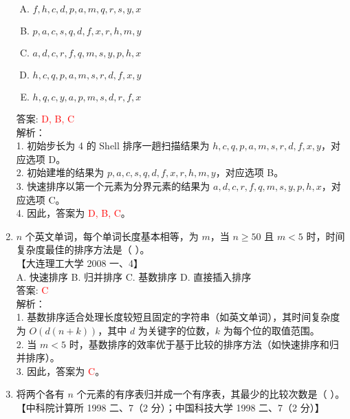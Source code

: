 \documentclass[lang=cn,newtx,10pt,scheme=chinese]{../../../elegantbook}
\begin{document}
\begin{enumerate}
    \begin{enumerate}[A.]
        \item $f, h, c, d, p, a, m, q, r, s, y, x$\\
        \item $p, a, c, s, q, d, f, x, r, h, m, y$\\
        \item $a, d, c, r, f, q, m, s, y, p, h, x$\\
        \item $h, c, q, p, a, m, s, r, d, f, x, y$\\
        \item $h, q, c, y, a, p, m, s, d, r, f, x$\\
    \end{enumerate}

    答案: \textcolor{red}{D, B, C} \\

    解析：\\
    1. 初始步长为 4 的 Shell 排序一趟扫描结果为 $h, c, q, p, a, m, s, r, d, f, x, y$，对应选项 D。\\
    2. 初始建堆的结果为 $p, a, c, s, q, d, f, x, r, h, m, y$，对应选项 B。\\
    3. 快速排序以第一个元素为分界元素的结果为 $a, d, c, r, f, q, m, s, y, p, h, x$，对应选项 C。\\
    4. 因此，答案为 \textcolor{red}{D, B, C}。\\
    \item $n$ 个英文单词，每个单词长度基本相等，为 $m$，当 $n ≥ 50$ 且 $m < 5$ 时，时间复杂度最佳的排序方法是（ ）。\\
    【大连理工大学 2008 一、4】\\  

    A. 快速排序 \quad B. 归并排序 \quad C. 基数排序 \quad D. 直接插入排序 \\  

    答案: \textcolor{red}{C} \\

    解析：\\
    1. 基数排序适合处理长度较短且固定的字符串（如英文单词），其时间复杂度为 $O(d(n + k))$，其中 $d$ 为关键字的位数，$k$ 为每个位的取值范围。\\
    2. 当 $m < 5$ 时，基数排序的效率优于基于比较的排序方法（如快速排序和归并排序）。\\
    3. 因此，答案为 \textcolor{red}{C}。\\

\item 将两个各有 $n$ 个元素的有序表归并成一个有序表，其最少的比较次数是（ ）。\\
    【中科院计算所 1998 二、7（2 分）；中国科技大学 1998 二、7（2 分）】\\  


\end{enumerate}
\end{document}
